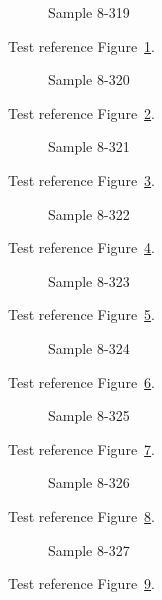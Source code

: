 \begin{figure}[tbhp]
\caption{Sample 8-319}
\label{fig:sample-8-319}
\end{figure}

Test reference Figure~\ref{fig:sample-8-319}.

\begin{figure}[tbhp]
\caption{Sample 8-320}
\label{fig:sample-8-320}
\end{figure}

Test reference Figure~\ref{fig:sample-8-320}.

\begin{figure}[tbhp]
\caption{Sample 8-321}
\label{fig:sample-8-321}
\end{figure}

Test reference Figure~\ref{fig:sample-8-321}.

\begin{figure}[tbhp]
\caption{Sample 8-322}
\label{fig:sample-8-322}
\end{figure}

Test reference Figure~\ref{fig:sample-8-322}.

\begin{figure}[tbhp]
\caption{Sample 8-323}
\label{fig:sample-8-323}
\end{figure}

Test reference Figure~\ref{fig:sample-8-323}.

\begin{figure}[tbhp]
\caption{Sample 8-324}
\label{fig:sample-8-324}
\end{figure}

Test reference Figure~\ref{fig:sample-8-324}.

\begin{figure}[tbhp]
\caption{Sample 8-325}
\label{fig:sample-8-325}
\end{figure}

Test reference Figure~\ref{fig:sample-8-325}.

\begin{figure}[tbhp]
\caption{Sample 8-326}
\label{fig:sample-8-326}
\end{figure}

Test reference Figure~\ref{fig:sample-8-326}.

\begin{figure}[tbhp]
\caption{Sample 8-327}
\label{fig:sample-8-327}
\end{figure}

Test reference Figure~\ref{fig:sample-8-327}.

